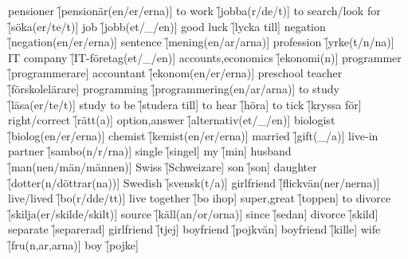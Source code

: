 \begin{questions}
\begin{multicols}{2}
        \question pensioner \f[pensionär(en/er/erna)]
        \question to work \f[jobba(r/de/t)]
        \question to search/look for \f[söka(er/te/t)]
        \question job \f[jobb(et/\_/en)]
        \question good luck \f[lycka till]
        \question negation \f[negation(en/er/erna)]
        \question sentence \f[mening(en/ar/arna)]
        \question profession \f[yrke(t/n/na)]
        \question IT company \f[IT-företag(et/\_/en)]
        \question accounts,economics \f[ekonomi(n)]
        \question programmer \f[programmerare]
        \question accountant \f[ekonom(en/er/erna)]
        \question preschool teacher \f[förskolelärare]
        \question programming \f[programmering(en/ar/arna)]
        \question to study \f[läsa(er/te/t)]
        \question study to be \f[studera till]
        \question to hear \f[höra]
        \question to tick \f[kryssa för]
        \question right/correct \f[rätt(a)]
        \question option,answer \f[alternativ(et/\_/en)]
        \question biologist \f[biolog(en/er/erna)]
        \question chemist \f[kemist(en/er/erna)]
        \question married \f[gift(\_/a)]
        \question live-in partner \f[sambo(n/r/rna)]
        \question single \f[singel]
        \question my \f[min]
        \question husband \f[man(nen/män/männen)]
        \question Swiss \f[Schweizare]
        \question son \f[son]
        \question daughter \f[dotter(n/döttrar(na))]
        \question Swedish \f[svensk(t/a)]
        \question girlfriend \f[flickvän(ner/nerna)]
        \question live/lived \f[bo(r/dde/tt)]
        \question live together \f[bo ihop]
        \question super,great \f[toppen]
        \question to divorce \f[skilja(er/skilde/skilt)]
        \question source \f[käll(an/or/orna)]
        \question since \f[sedan]
        \question divorce \f[skild]
        \question separate \f[separerad]
        \question girlfriend \f[tjej]
        \question boyfriend \f[pojkvän]
        \question boyfriend \f[kille]
        \question wife \f[fru(n,ar,arna)]
        \question boy \f[pojke]
    \end{multicols}
\end{questions}
